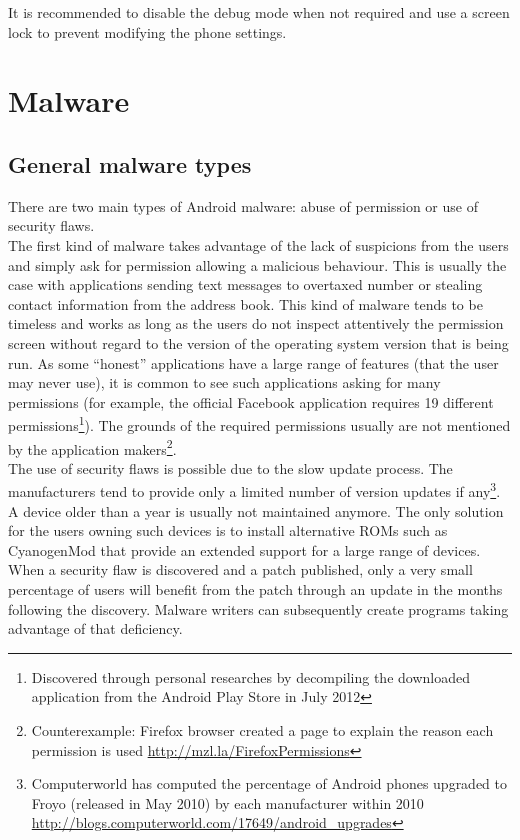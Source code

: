 It is recommended to disable the debug mode when not required and use a screen lock to prevent modifying the phone settings.

\section{Malware}
\label{sec:and-malware}

\subsection{General malware types}
\label{sec:malware-type}

There are two main types of Android malware: abuse of permission or use of security flaws.\\

The first kind of malware takes advantage of the lack of suspicions from the users and simply ask for permission allowing a malicious behaviour.
This is usually the case with applications sending text messages to overtaxed number or stealing contact information from the address book.
This kind of malware tends to be timeless and works as long as the users do not inspect attentively the permission screen without regard to the version of the operating system version that is being run.
As some ``honest'' applications have a large range of features (that the user may never use), it is common to see such applications asking for many permissions (for example, the official Facebook application requires 19 different permissions\footnote{Discovered through personal researches by decompiling the downloaded application from the Android Play Store in July 2012}).
The grounds of the required permissions usually are not mentioned by the application makers\footnote{Counterexample: Firefox browser created a page to explain the reason each permission is used \url{http://mzl.la/FirefoxPermissions}}.\\

The use of security flaws is possible due to the slow update process.
The manufacturers tend to provide only a limited number of version updates if any\footnote{Computerworld has computed the percentage of Android phones upgraded to Froyo (released in May 2010) by each manufacturer within 2010 \url{http://blogs.computerworld.com/17649/android_upgrades}}.
A device older than a year is usually not maintained anymore.
The only solution for the users owning such devices is to install alternative ROMs such as CyanogenMod that provide an extended support for a large range of devices.
When a security flaw is discovered and a patch published, only a very small percentage of users will benefit from the patch through an update in the months following the discovery.
Malware writers can subsequently create programs taking advantage of that deficiency.\\

